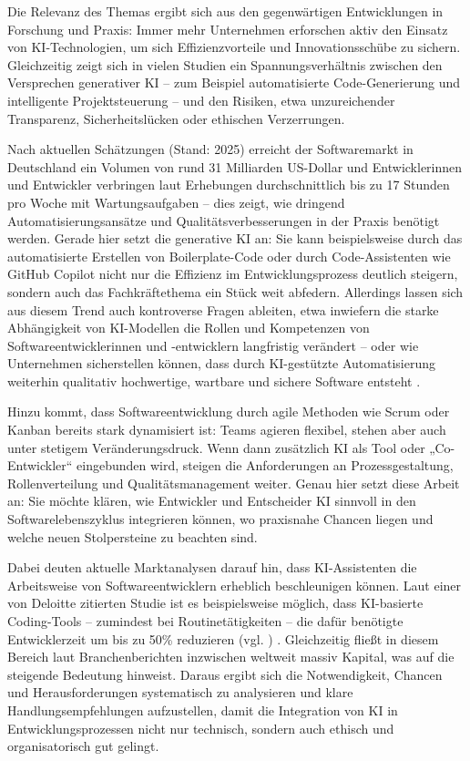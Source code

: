 Die Relevanz des Themas ergibt sich aus den gegenwärtigen Entwicklungen in Forschung und Praxis: Immer mehr Unternehmen erforschen aktiv den Einsatz von KI-Technologien, um sich Effizienzvorteile und Innovationsschübe zu sichern. Gleichzeitig zeigt sich in vielen Studien ein Spannungsverhältnis zwischen den Versprechen generativer KI – zum Beispiel automatisierte Code-Generierung und intelligente Projektsteuerung – und den Risiken, etwa unzureichender Transparenz, Sicherheitslücken oder ethischen Verzerrungen.

Nach aktuellen Schätzungen (Stand: 2025) erreicht der Softwaremarkt in Deutschland ein Volumen von rund 31 Milliarden US-Dollar und Entwicklerinnen und Entwickler verbringen laut Erhebungen durchschnittlich bis zu 17 Stunden pro Woche mit Wartungsaufgaben – dies zeigt, wie dringend Automatisierungsansätze und Qualitätsverbesserungen in der Praxis benötigt werden. Gerade hier setzt die generative KI an: Sie kann beispielsweise durch das automatisierte Erstellen von Boilerplate-Code oder durch Code-Assistenten wie GitHub Copilot nicht nur die Effizienz im Entwicklungsprozess deutlich steigern, sondern auch das Fachkräftethema ein Stück weit abfedern. Allerdings lassen sich aus diesem Trend auch kontroverse Fragen ableiten, etwa inwiefern die starke Abhängigkeit von KI-Modellen die Rollen und Kompetenzen von Softwareentwicklerinnen und -entwicklern langfristig verändert – oder wie Unternehmen sicherstellen können, dass durch KI-gestützte Automatisierung weiterhin qualitativ hochwertige, wartbare und sichere Software entsteht \cite{fraunhofer2024}.

Hinzu kommt, dass Softwareentwicklung durch agile Methoden wie Scrum oder Kanban bereits stark dynamisiert ist: Teams agieren flexibel, stehen aber auch unter stetigem Veränderungsdruck. Wenn dann zusätzlich KI als Tool oder „Co-Entwickler“ eingebunden wird, steigen die Anforderungen an Prozessgestaltung, Rollenverteilung und Qualitätsmanagement weiter. Genau hier setzt diese Arbeit an: Sie möchte klären, wie Entwickler und Entscheider KI sinnvoll in den Softwarelebenszyklus integrieren können, wo praxisnahe Chancen liegen und welche neuen Stolpersteine zu beachten sind.

Dabei deuten aktuelle Marktanalysen darauf hin, dass KI-Assistenten die Arbeitsweise von Softwareentwicklern erheblich beschleunigen können. Laut einer von Deloitte zitierten Studie ist es beispielsweise möglich, dass KI-basierte Coding-Tools – zumindest bei Routinetätigkeiten – die dafür benötigte Entwicklerzeit um bis zu 50\% reduzieren (vgl. \cite{deloitte2024})
. Gleichzeitig fließt in diesem Bereich laut Branchenberichten inzwischen weltweit massiv Kapital, was auf die steigende Bedeutung hinweist. Daraus ergibt sich die Notwendigkeit, Chancen und Herausforderungen systematisch zu analysieren und klare Handlungsempfehlungen aufzustellen, damit die Integration von KI in Entwicklungsprozessen nicht nur technisch, sondern auch ethisch und organisatorisch gut gelingt.